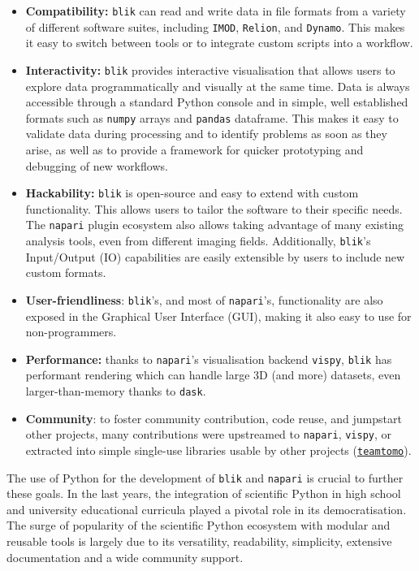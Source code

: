 \begin{itemize}
    \item \textbf{Compatibility:} \texttt{blik} can read and write data in file formats from a variety of different software suites, including \texttt{IMOD}, \texttt{Relion}, and \texttt{Dynamo}. This makes it easy to switch between tools or to integrate custom scripts into a workflow. 
    \item \textbf{Interactivity:} \texttt{blik} provides interactive visualisation that allows users to explore data programmatically and visually at the same time. Data is always accessible through a standard Python console and in simple, well established formats such as \texttt{numpy} arrays and \texttt{pandas} dataframe. This makes it easy to validate data during processing and to identify problems as soon as they arise, as well as to provide a framework for quicker prototyping and debugging of new workflows. 
    \item \textbf{Hackability:} \texttt{blik} is open-source and easy to extend with custom functionality. This allows users to tailor the software to their specific needs. The \texttt{napari} plugin ecosystem also allows taking advantage of many existing analysis tools, even from different imaging fields. Additionally, \texttt{blik}'s Input/Output (IO) capabilities are easily extensible by users to include new custom formats. 
    \item \textbf{User-friendliness}: \texttt{blik}'s, and most of \texttt{napari}'s, functionality are also exposed in the Graphical User Interface (GUI), making it also easy to use for non-programmers. 
    \item \textbf{Performance:} thanks to \texttt{napari}'s visualisation backend \texttt{vispy}, \texttt{blik} has performant rendering which can handle large 3D (and more) datasets, even larger-than-memory thanks to \texttt{dask}. 
    \item \textbf{Community}: to foster community contribution, code reuse, and jumpstart other projects, many contributions were upstreamed to \texttt{napari}, \texttt{vispy}, or extracted into simple single-use libraries usable by other projects (\href{https://github.com/teamtomo/}{\texttt{teamtomo}}).
\end{itemize}

The use of Python for the development of \texttt{blik} and \texttt{napari} is crucial to further these goals. In the last years, the integration of scientific Python in high school and university educational curricula played a pivotal role in its democratisation. The surge of popularity of the scientific Python ecosystem with modular and reusable tools is largely due to its versatility, readability, simplicity, extensive documentation and a wide community support.

